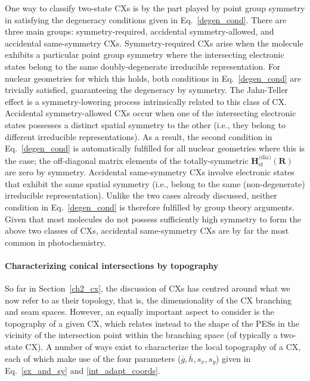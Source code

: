 \documentclass[9pt,bestpractices,pubversion]{livecoms}
\newcommand{\R}{\mathbf{R}}
\begin{document}
One way to classify two-state CXs is by the part played by point group symmetry in satisfying the degeneracy conditions given in Eq.~\eqref{degen_cond}.
There are three main groups: symmetry-required, accidental symmetry-allowed, and accidental same-symmetry CXs.
Symmetry-required CXs arise when the molecule exhibits a particular point group symmetry where the intersecting electronic states belong to the same doubly-degenerate irreducible representation.
For nuclear geometries for which this holds, both conditions in Eq.~\eqref{degen_cond} are trivially satisfied, guaranteeing the degeneracy by symmetry.\cite{yarkony_nonadiabatic_2012}
The Jahn-Teller effect\cite{jahn1937stability} is a symmetry-lowering process intrinsically related to this class of CX.\cite{Persico2018}
Accidental symmetry-allowed CXs occur when one of the intersecting electronic states possesses a distinct spatial symmetry to the other (i.e., they belong to different irreducible representations).
As a result, the second condition in Eq.~\eqref{degen_cond} is automatically fulfilled for all nuclear geometries where this is the case;\cite{zhu_non-adiabaticity_2016} the off-diagonal matrix elements of the totally-symmetric $\mathbf{H}_{\text{el}}^{\text{(dia)}}(\R)$ are zero by symmetry.\cite{kjonstad2017crossing}
Accidental same-symmetry CXs involve electronic states that exhibit the same spatial symmetry (i.e., belong to the same (non-degenerate) irreducible representation).
Unlike the two cases already discussed, neither condition in Eq.~\eqref{degen_cond} is therefore fulfilled by group theory arguments.\cite{kjonstad2017crossing} 
Given that most molecules do not possess sufficiently high symmetry to form the above two classes of CXs, accidental same-symmetry CXs are by far the most common in photochemistry.\cite{matsika_electronic_2021}

\paragraph{Characterizing conical intersections by topography}
\label{ch2_topog}
So far in Section~\ref{ch2_cx}, the discussion of CXs has centred around what we now refer to as their topology, that is, the dimensionality of the CX branching and seam spaces.
However, an equally important aspect to consider is the topography of a given CX,\cite{matsika_electronic_2021, farfan_systematic_2020} which relates instead to the shape of the PESs in the vicinity of the intersection point within the branching space (of typically a two-state CX).
A number of ways exist to characterize the local topography of a CX, each of which make use of the four parameters ($\overline{g}, \overline{h}, s_x, s_y$) given in Eq.~\eqref{sx_and_sy} and \eqref{int_adapt_coords}.
\end{document}
